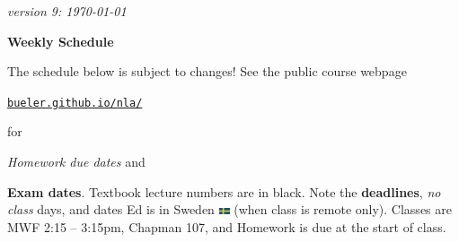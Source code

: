 \documentclass[12pt]{article}
\newcommand{\vacinline}[1]{{\color{OliveGreen} \textsl{#1}}}
\newcommand{\due}[1]{\strut {\color{BrickRed} \textsl{#1}}}
\newcommand{\ee}[1]{\strut {\color{Blue} \textbf{#1}}}
\newcommand{\dlinline}[1]{{\color{Purple} \textbf{#1}}}
\begin{document}
\hfill \small \emph{version 9: \today} \normalsize

\bigskip\bigskip
\centerline{\Large \textbf{Weekly Schedule}}

\bigskip
The schedule below is subject to changes!  See the public course webpage

\medskip

\centerline{\href{https://bueler.github.io/nla/index.html}{\texttt{bueler.github.io/nla/}}}

\noindent for \due{Homework due dates} and \ee{Exam dates}.  Textbook lecture numbers are in black.  Note the \dlinline{deadlines}, \vacinline{no class} days, and dates Ed is in Sweden \includegraphics[width=12px]{sweden.png} (when class is remote only).  Classes are MWF 2:15 -- 3:15pm, Chapman 107, and Homework is due at the start of class.

\bigskip
\end{document}
